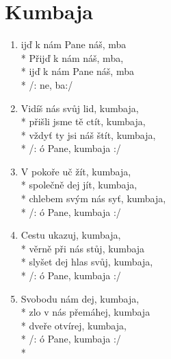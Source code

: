 \section{Kumbaja}
\begin{enumerate}
\item {}ijď k nám Pane náš, mba \\*
Přijď k nám  náš, mba,  \\*
ijď k nám Pane náš, mba \\*
/:  ne, ba:/ 
\item Vidíš nás svůj lid, kumbaja, \\*
přišli jsme tě ctít, kumbaja, \\*
vždyť ty jsi náš štít, kumbaja, \\*
/: ó Pane, kumbaja :/ 
\item V pokoře uč žít, kumbaja, \\*
společně dej jít, kumbaja, \\*
chlebem svým nás syť, kumbaja, \\*
/: ó Pane, kumbaja :/ 
\item Cestu ukazuj, kumbaja, \\*
věrně při nás stůj, kumbaja \\*
slyšet dej hlas svůj, kumbaja, \\*
/: ó Pane, kumbaja :/ 
\item Svobodu nám dej, kumbaja, \\*
zlo v nás přemáhej, kumbaja \\*
dveře otvírej, kumbaja, \\*
/: ó Pane, kumbaja :/ \\*
\end{enumerate}
